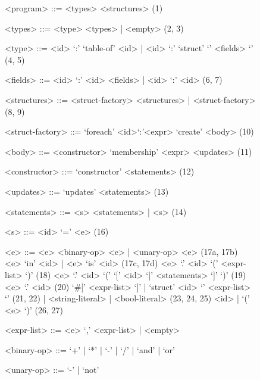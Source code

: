 {
\scriptsize
\begin{figure}[!ht]
\begin{mdframed}[outermargin=0.5cm, innermargin=0.5cm]

\newcommand{\grule}[1]{\hfill{\scriptsize (#1)}}
\setlength{\grammarindent}{5em}
\begin{grammar}

<program> ::= <types> <structures> \grule{1}

<types> ::= <type> <types> | <empty> \grule{2, 3}

<type> ::= <id> `:' `table-of' <id> | <id> `:' `struct' `{' <fields> `}' \grule{4, 5}

<fields> ::= <id> `:' <id> <fields> | <id> `:' <id> \grule{6, 7}

<structures> ::= <struct-factory> <structures> | <struct-factory> \grule{8, 9}

<struct-factory> ::= `foreach' <id>`:'<expr> `create' <body> \grule{10}


<body> ::= <constructor> `membership' <expr> <updates> \grule{11}

<constructor> ::= `constructor' <statements> \grule{12}


<updates> ::= `updates' <statements> \grule{13}

<statements> ::= <s> <statements> | <s> \grule{14}

<s> ::= <id> `=' <e>  \grule{16} 

<e> ::= <e> <binary-op> <e> | <unary-op> <e> \grule{17a, 17b}
\alt <e> `in' <id> | <e> `is' <id> \grule{17c, 17d}
\alt <e> `.' <id> `(' <expr-list> `)' \grule{18}
\alt <e> `.' <id> `(' `[' <id> `|' <statements> `]' `)' \grule{19}
\alt <e> `.' <id> \grule{20}
\alt `#[' <expr-list> `]' | `struct' <id> `{' <expr-list> `}' \grule{21, 22}
 | <string-literal> | <bool-literal> \grule{23, 24, 25}
\alt <id> | `(' <e> `)' \grule{26, 27}

<expr-list> ::= <e> `,' <expr-list> | <empty> 

<binary-op> ::= `+' | `*' | `-' | `/' | `and' | `or'

<unary-op> ::= `-' | `not'


\end{grammar}
\end{mdframed}
\end{figure}
}

